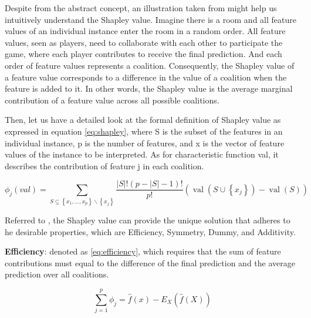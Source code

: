 Despite from the abstract concept, an illustration taken from \cite{molnar2019} might help us intuitively understand the Shapley value. Imagine there is a room and all feature values of an individual instance enter the room in a random order. All feature values, seen as players, need to collaborate with each other to participate the game, where each player contributes to receive the final prediction. And each order of feature values represents a coalition. Consequently, the Shapley value of a feature value corresponds to a difference in the value of a coalition when the feature is added to it. In other words, the Shapley value is the average marginal contribution of a feature value across all possible coalitions. 

Then, let us have a detailed look at the formal definition of Shapley value as expressed in equation \ref{eq:shapley}, where S is the subset of the features in an individual instance, p is the number of features, and x is the vector of feature values of the instance to be interpreted. As for characteristic function val, it describes the contribution of feature j in each coalition.




\begin{equation} \label{eq:shapley}
\phi_{j}(v a l)=\sum_{S \subseteq\left\{x_{1}, \ldots, x_{p}\right\} \backslash\left\{x_{j}\right\}} \frac{|S| !(p-|S|-1) !}{p !}\left(\operatorname{val}\left(S \cup\left\{x_{j}\right\}\right)-\operatorname{val}(S)\right)
\end{equation}

Referred to \cite{shapley1953value}, the Shapley value can provide the unique solution that adheres to he desirable properties, which are Efficiency, Symmetry, Dummy, and Additivity.

\textbf{Efficiency}: denoted as \ref*{eq:efficiency}, which requires that the sum of feature contributions must equal to the difference of the final prediction and the average prediction over all coalitions. 

\begin{equation} \label{eq:efficiency}
\sum_{j=1}^{p} \phi_{j}=\hat{f}(x)-E_{X}(\hat{f}(X))
\end{equation}

